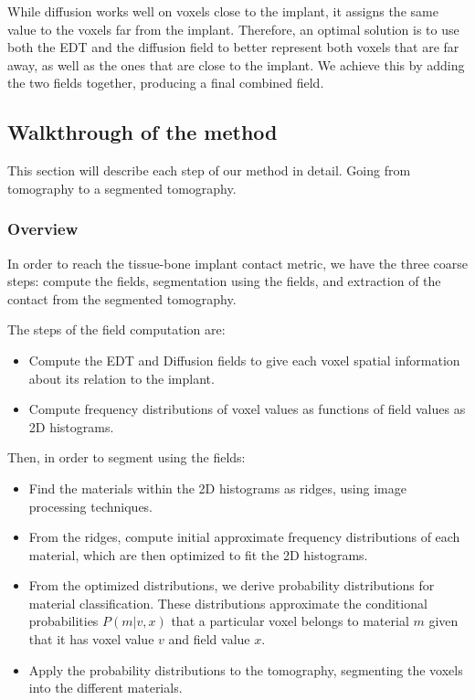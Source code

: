 While diffusion works well on voxels close to the implant, it assigns the same value to the voxels
far from the implant. Therefore, an optimal solution is to use both the EDT and the diffusion field
to better represent both voxels that are far away, as well as the ones that are close to the implant.
We achieve this by adding the two fields together, producing a final combined field.


\subsection{Walkthrough of the method}
This section will describe each step of our method in detail. Going from tomography to a segmented tomography.

\subsubsection{Overview}
In order to reach the tissue-bone implant contact metric, we have the three coarse steps: compute the fields, segmentation using the fields, and extraction of the contact from the segmented tomography.

The steps of the field computation are:
\begin{itemize}
    \item Compute the EDT and Diffusion fields to give each voxel spatial information about its relation to the implant.
    \item Compute frequency distributions of voxel values as functions of field values as 2D histograms.
\end{itemize}

Then, in order to segment using the fields:
\begin{itemize}
    \item Find the materials within the 2D histograms as ridges, using image processing techniques.
    \item From the ridges, compute initial approximate frequency distributions of each material, which are then optimized to fit the 2D histograms.
    \item From the optimized distributions, we derive probability distributions for material classification. These distributions approximate the conditional probabilities $P(m|v,x)$ that a particular voxel belongs to material $m$ given that it has voxel value $v$ and field value $x$.
    \item Apply the probability distributions to the tomography, segmenting the voxels into the different materials.
\end{itemize}

